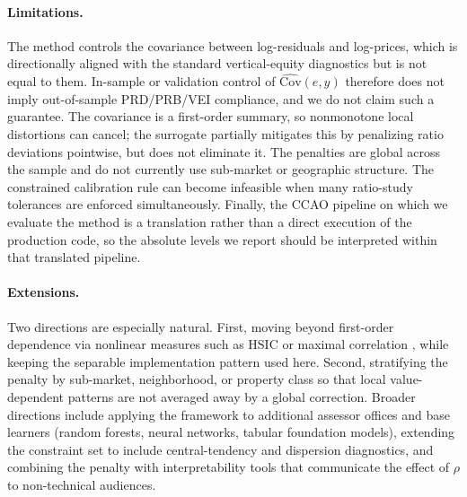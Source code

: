 \documentclass{article}
\theoremstyle{plain}
\theoremstyle{definition}
\newcommand{\1}{\mathbf{1}}
\newcommand{\Cov}{\text{Cov}}
\begin{document}
\paragraph{Limitations.}
The method controls the covariance between log-residuals and log-prices, which is directionally aligned with the standard vertical-equity diagnostics but is not equal to them. In-sample or validation control of $\widehat{\Cov}(e,y)$ therefore does not imply out-of-sample PRD/PRB/VEI compliance, and we do not claim such a guarantee. The covariance is a first-order summary, so nonmonotone local distortions can cancel; the surrogate partially mitigates this by penalizing ratio deviations pointwise, but does not eliminate it. The penalties are global across the sample and do not currently use sub-market or geographic structure. The constrained calibration rule can become infeasible when many ratio-study tolerances are enforced simultaneously. Finally, the CCAO pipeline on which we evaluate the method is a translation rather than a direct execution of the production code, so the absolute levels we report should be interpreted within that translated pipeline.

\paragraph{Extensions.}
Two directions are especially natural. First, moving beyond first-order dependence via nonlinear measures such as HSIC or maximal correlation \cite{LiEtAl2022Fairness,lee2022maximal}, while keeping the separable implementation pattern used here. Second, stratifying the penalty by sub-market, neighborhood, or property class so that local value-dependent patterns are not averaged away by a global correction. Broader directions include applying the framework to additional assessor offices and base learners (random forests, neural networks, tabular foundation models), extending the constraint set to include central-tendency and dispersion diagnostics, and combining the penalty with interpretability tools that communicate the effect of $\rho$ to non-technical audiences.

\end{document}
